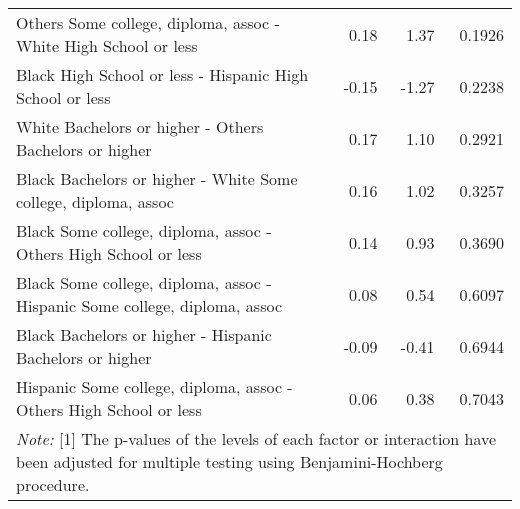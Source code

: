\begin{center}
\begin{longtable}{lrrr}
    Others Some college, diploma, assoc -  White High School or less & 0.18 & 1.37 & 0.1926 \\ 
    Black High School or less -  Hispanic High School or less & -0.15 & -1.27 & 0.2238 \\ 
    White Bachelors or higher -  Others Bachelors or higher & 0.17 & 1.10 & 0.2921 \\ 
    Black Bachelors or higher -  White Some college, diploma, assoc & 0.16 & 1.02 & 0.3257 \\ 
    Black Some college, diploma, assoc -  Others High School or less & 0.14 & 0.93 & 0.3690 \\ 
    Black Some college, diploma, assoc -  Hispanic Some college, diploma, assoc & 0.08 & 0.54 & 0.6097 \\ 
    Black Bachelors or higher -  Hispanic Bachelors or higher & -0.09 & -0.41 & 0.6944 \\ 
    Hispanic Some college, diploma, assoc -  Others High School or less & 0.06 & 0.38 & 0.7043 \\ 
   \hline
\multicolumn{4}{l}{
  \begin{minipage}{15cm}
\textit{Note:} [1] The p-values of the levels of each factor or interaction have been adjusted for multiple testing using Benjamini-Hochberg procedure.
  \end{minipage}
}\\

\end{longtable}

\end{center}

\doublespacing

